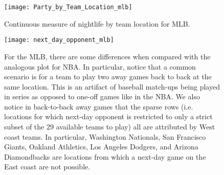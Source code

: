 \documentclass[letterpaper,12pt]{article}
\begin{document}
\begin{figure}[h]
  \hspace{-55pt}
  \label{fig: party by team location mlb}
  \texttt{[image: Party\_by\_Team\_Location\_mlb]}
  \caption{Continuous measure of nightlife by team location for MLB.}
\end{figure}
\begin{figure}   
  \centering
  \hspace{-55pt}
  \label{fig: next day opponent mlb}
  \texttt{[image: next\_day\_opponent\_mlb]} 
  \caption{For the MLB, there are some differences when compared with the     analogous
  plot for NBA. In particular, notice that a common scenario is for a team to play two away games 
  back to back at the same location. This is an artifact of baseball match-ups being played 
  in series as opposed to one-off games like in the NBA. We also notice in back-to-back
  away games that the sparse rows 
  (i.e. locations for which next-day opponent is restricted to only a strict subset of the 
  29 available teams to play) all are attributed by West coast teams. In particular, 
  Washington Nationals, San Francisco Giants, Oakland Athletics, Los Angeles Dodgers, and 
  Arizona Diamondbacks are locations from which a next-day game on the East coast are not possible.}
\end{figure}
\end{document}
